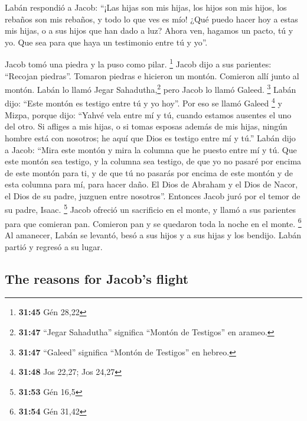 \begin{paracol}{2}
 Labán respondió a Jacob: ``¡Las hijas son mis hijas, los
hijos son mis hijos, los rebaños son mis rebaños, y todo lo que ves es
mío! ¿Qué puedo hacer hoy a estas mis hijas, o a sus hijos que han dado
a luz?  Ahora ven, hagamos un pacto, tú y yo. Que sea
para que haya un testimonio entre tú y yo''.

 Jacob tomó una piedra y la puso como pilar. \footnote{\textbf{31:45}
  Gén 28,22}  Jacob dijo a sus parientes: ``Recojan
piedras''. Tomaron piedras e hicieron un montón. Comieron allí junto al
montón.  Labán lo llamó Jegar Sahadutha,\footnote{\textbf{31:47}
  ``Jegar Sahadutha'' significa ``Montón de Testigos'' en arameo.} pero
Jacob lo llamó Galeed. \footnote{\textbf{31:47} ``Galeed'' significa
  ``Montón de Testigos'' en hebreo.}  Labán dijo: ``Este
montón es testigo entre tú y yo hoy''. Por eso se llamó Galeed
\footnote{\textbf{31:48} Jos 22,27; Jos 24,27}  y Mizpa,
porque dijo: ``Yahvé vela entre mí y tú, cuando estamos ausentes el uno
del otro.  Si afliges a mis hijas, o si tomas esposas
además de mis hijas, ningún hombre está con nosotros; he aquí que Dios
es testigo entre mí y tú.''  Labán dijo a Jacob: ``Mira
este montón y mira la columna que he puesto entre mí y tú.
 Que este montón sea testigo, y la columna sea testigo,
de que yo no pasaré por encima de este montón para ti, y de que tú no
pasarás por encima de este montón y de esta columna para mí, para hacer
daño.  El Dios de Abraham y el Dios de Nacor, el Dios de
su padre, juzguen entre nosotros''. Entonces Jacob juró por el temor de
su padre, Isaac. \footnote{\textbf{31:53} Gén 16,5} 
Jacob ofreció un sacrificio en el monte, y llamó a sus parientes para
que comieran pan. Comieron pan y se quedaron toda la noche en el monte.
\footnote{\textbf{31:54} Gén 31,42}  Al amanecer, Labán
se levantó, besó a sus hijos y a sus hijas y los bendijo. Labán partió y
regresó a su lugar.

\switchcolumn
\begin{otherlanguage}{english}

\hypertarget{the-reasons-for-jacobs-flight}{%
\subsection{The reasons for Jacob's
flight}\label{the-reasons-for-jacobs-flight}}

\hypertarget{section-61}{%
}
\end{otherlanguage}
\end{paracol}
